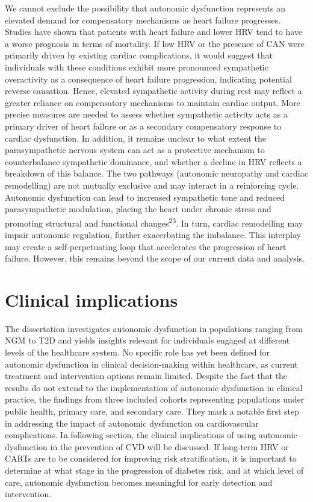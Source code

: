 \documentclass[
  a4paper,
  headsepline=true,
  open=any]{scrbook}
\begin{document}
We cannot exclude the possibility that autonomic dysfunction represents
an elevated demand for compensatory mechanisms as heart failure
progresses. Studies have shown that patients with heart failure and
lower HRV tend to have a worse prognosis in terms of mortality. If low
HRV or the presence of CAN were primarily driven by existing cardiac
complications, it would suggest that individuals with these conditions
exhibit more pronounced sympathetic overactivity as a consequence of
heart failure progression, indicating potential reverse causation.
Hence, elevated sympathetic activity during rest may reflect a greater
reliance on compensatory mechanisms to maintain cardiac output. More
precise measures are needed to assess whether sympathetic activity acts
as a primary driver of heart failure or as a secondary compensatory
response to cardiac dysfunction. In addition, it remains unclear to what
extent the parasympathetic nervous system can act as a protective
mechanism to counterbalance sympathetic dominance, and whether a decline
in HRV reflects a breakdown of this balance. The two pathways (autonomic
neuropathy and cardiac remodelling) are not mutually exclusive and may
interact in a reinforcing cycle. Autonomic dysfunction can lead to
increased sympathetic tone and reduced parasympathetic modulation,
placing the heart under chronic stress and promoting structural and
functional changes\textsuperscript{23}. In turn, cardiac remodelling may
impair autonomic regulation, further exacerbating the imbalance. This
interplay may create a self-perpetuating loop that accelerates the
progression of heart failure. However, this remains beyond the scope of
our current data and analysis.

\hypertarget{clinical-implications}{%
\section{Clinical implications}\label{clinical-implications}}

The dissertation investigates autonomic dysfunction in populations
ranging from NGM to T2D and yields insights relevant for individuals
engaged at different levels of the healthcare system. No specific role
has yet been defined for autonomic dysfunction in clinical
decision-making within healthcare, as current treatment and intervention
options remain limited. Despite the fact that the results do not extend
to the implementation of autonomic dysfunction in clinical practice, the
findings from three included cohorts representing populations under
public health, primary care, and secondary care. They mark a notable
first step in addressing the impact of autonomic dysfunction on
cardiovascular complications. In following section, the clinical
implications of using autonomic dysfunction in the prevention of CVD
will be discussed. If long-term HRV or CARTs are to be considered for
improving risk stratification, it is important to determine at what
stage in the progression of diabetes risk, and at which level of care,
autonomic dysfunction becomes meaningful for early detection and
intervention.
\end{document}
